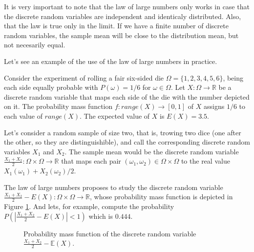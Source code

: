 It is very important to note that the law of large numbers only works in case that the discrete random variables are independent and identicaly distributed. Also, that the law is true only in the limit. If we have a finite number of discrete random variables, the sample mean will be close to the distribution mean, but not necesarily equal.

Let's see an example of the use of the law of large numbers in practice.

\begin{example}
Consider the experiment of rolling a fair six-sided die $\Omega = \{1, 2, 3, 4, 5, 6\}$, being each side equally probable with $P(\omega)=1/6$ for $\omega \in \Omega$. Let $X:\Omega \rightarrow \mathbb{R}$ be a discrete random variable that maps each side of the die with the number depicted on it. The probability mass function $f: range(X) \rightarrow [0, 1]$ of $X$ assigns $1/6$ to each value of $range(X)$. The expected value of $X$ is $E(X) = 3.5$.

Let's consider a random sample of size two, that is, trowing two dice (one after the other, so they are distinguishible), and call the corresponding discrete random variables $X_1$ and $X_2$. The sample mean would be the discrete random variable $\frac{X_1 + X_2}{2}: \Omega \times \Omega \rightarrow \mathbb{R}$ that maps each pair $(\omega_1, \omega_2) \in \Omega \times \Omega$ to the real value $X_1(\omega_1) + X_2(\omega_2) / 2$. 

The law of large numbers proposes to study the discrete random variable $\frac{X_1 + X_2}{2} - E(X): \Omega \times \Omega \rightarrow \mathbb{R}$, whose probability mass function is depicted in Figure \ref{fig:law_large_numbers_1}. And lets, for example, compute the probability $P(  |\frac{X_1 + X_2}{2} - E(X)| < 1 )$ which is $0.444$.

\begin{figure}[t]
\centering
{}
\caption{\label{fig:law_large_numbers_1}Probability mass function of the discrete random variable $\frac{X_1 + X_2 }{2} - \mathbb{E}(X)$.}
\end{figure}


\end{example}

